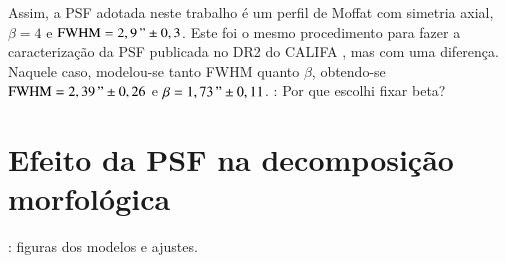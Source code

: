 Assim, a PSF adotada neste trabalho é um perfil de Moffat com simetria axial,
$\beta=4$ e $\mathrm{FWHM}=2,9\," \pm 0,3$. Este foi o mesmo procedimento para
fazer a caracterização da PSF publicada no DR2 do CALIFA
\citep{GarciaBenito2015}, mas com uma diferença. Naquele caso, modelou-se tanto
FWHM quanto $\beta$, obtendo-se $\mathrm{FWHM}=2,39\," \pm 0,26$ e
$\beta=1,73\," \pm 0,11$. \TODO: Por que escolhi fixar beta?


\section{Efeito da PSF na decomposição morfológica}

\TODO: figuras dos modelos e ajustes.


